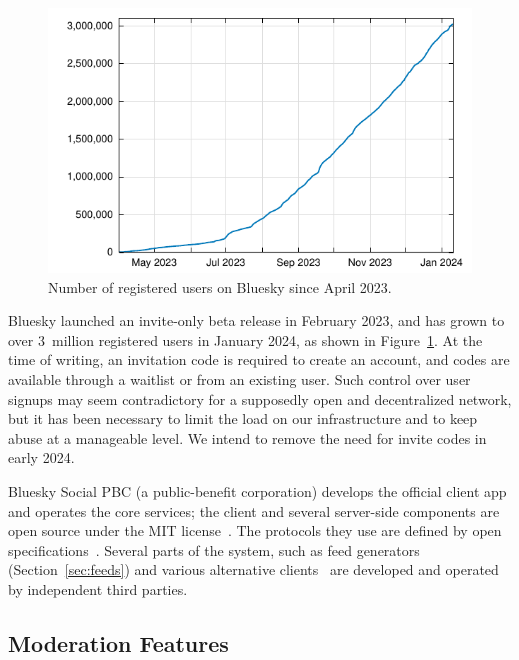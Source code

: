 \documentclass[sigconf,nonacm]{acmart}
\begin{document}
\begin{figure}
    \centering
    \includegraphics[width=\linewidth]{user-growth.pdf}
    \caption{Number of registered users on Bluesky since April 2023.}
    \label{fig:user-growth}
\end{figure}

Bluesky launched an invite-only beta release in February 2023, and has grown to over 3~million registered users in January 2024, as shown in Figure~\ref{fig:user-growth}.
At the time of writing, an invitation code is required to create an account, and codes are available through a waitlist or from an existing user.
Such control over user signups may seem contradictory for a supposedly open and decentralized network, but it has been necessary to limit the load on our infrastructure and to keep abuse at a manageable level.
We intend to remove the need for invite codes in early 2024.

Bluesky Social PBC (a public-benefit corporation) develops the official client app and operates the core services; the client and several server-side components are open source under the MIT license~\cite{BlueskyGithub}.
The protocols they use are defined by open specifications~\cite{AtProtoSpecs}.
Several parts of the system, such as feed generators (Section~\ref{sec:feeds}) and various alternative clients~\cite{AtProtoClients} are developed and operated by independent third parties.

\subsection{Moderation Features}\label{sec:moderation}
\end{document}
